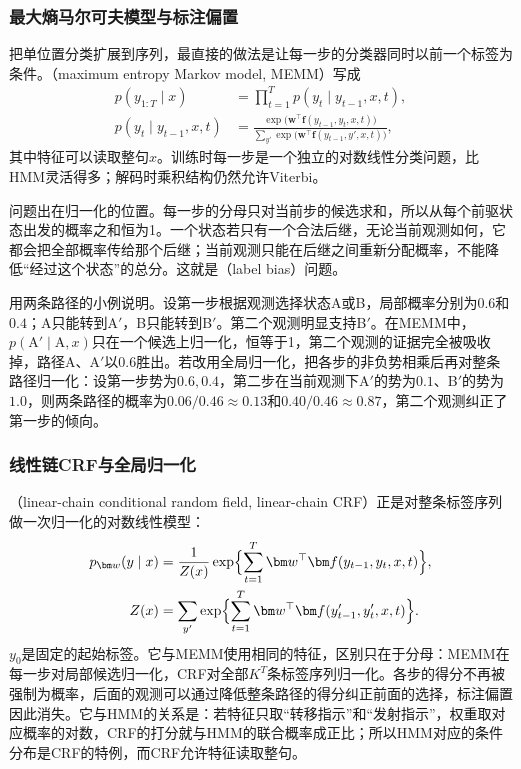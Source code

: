 \subsubsection{最大熵马尔可夫模型与标注偏置}
\label{sec:nlp-classical-memm}

把单位置分类扩展到序列，最直接的做法是让每一步的分类器同时以前一个标签为条件。（maximum entropy Markov model, MEMM）写成
\begin{equation}
  \begin{aligned}
    p(y_{1:T}\mid x)&=\prod_{t=1}^{T}p(y_t\mid y_{t-1},x,t),\\
    p(y_t\mid y_{t-1},x,t)&=\frac{\exp\bigl(\bm w^{\top}\bm f(y_{t-1},y_t,x,t)\bigr)}{\sum_{y'}\exp\bigl(\bm w^{\top}\bm f(y_{t-1},y',x,t)\bigr)},
  \end{aligned}
  \label{eq:nlp-classical-memm}
\end{equation}
其中特征可以读取整句$x$。训练时每一步是一个独立的对数线性分类问题，比HMM灵活得多；解码时乘积结构仍然允许Viterbi。

问题出在归一化的位置。每一步的分母只对当前步的候选求和，所以从每个前驱状态出发的概率之和恒为1。一个状态若只有一个合法后继，无论当前观测如何，它都会把全部概率传给那个后继；当前观测只能在后继之间重新分配概率，不能降低“经过这个状态”的总分。这就是（label bias）问题。

用两条路径的小例说明。设第一步根据观测选择状态A或B，局部概率分别为$0.6$和$0.4$；A只能转到A$'$，B只能转到B$'$。第二个观测明显支持B$'$。在MEMM中，$p(\mathrm A'\mid\mathrm A,x)$只在一个候选上归一化，恒等于1，第二个观测的证据完全被吸收掉，路径A、A$'$以$0.6$胜出。若改用全局归一化，把各步的非负势相乘后再对整条路径归一化：设第一步势为$0.6,0.4$，第二步在当前观测下A$'$的势为$0.1$、B$'$的势为$1.0$，则两条路径的概率为$0.06/0.46\approx0.13$和$0.40/0.46\approx0.87$，第二个观测纠正了第一步的倾向。

\subsubsection{线性链CRF与全局归一化}
\label{sec:nlp-classical-crf}

（linear-chain conditional random field, linear-chain CRF）正是对整条标签序列做一次归一化的对数线性模型：
\begin{equation}
  \begin{aligned}
    p_{\bm w}(y\mid x)&=\frac{1}{Z(x)}\exp\Bigl\{\sum_{t=1}^{T}\bm w^{\top}\bm f(y_{t-1},y_t,x,t)\Bigr\},\\
    Z(x)&=\sum_{y'}\exp\Bigl\{\sum_{t=1}^{T}\bm w^{\top}\bm f(y'_{t-1},y'_t,x,t)\Bigr\}.
  \end{aligned}
  \label{eq:nlp-classical-crf}
\end{equation}
$y_0$是固定的起始标签。它与MEMM使用相同的特征，区别只在于分母：MEMM在每一步对局部候选归一化，CRF对全部$K^T$条标签序列归一化。各步的得分不再被强制为概率，后面的观测可以通过降低整条路径的得分纠正前面的选择，标注偏置因此消失。它与HMM的关系是：若特征只取“转移指示”和“发射指示”，权重取对应概率的对数，CRF的打分就与HMM的联合概率成正比；所以HMM对应的条件分布是CRF的特例，而CRF允许特征读取整句。

